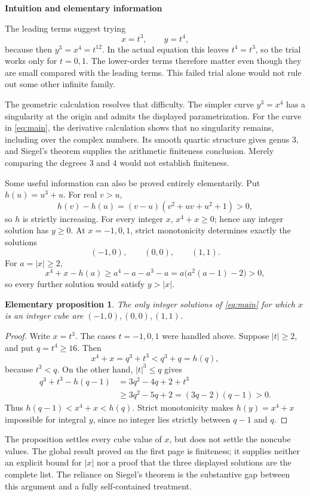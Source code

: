 \documentclass[11pt,a4paper]{article}
\newtheorem*{proposition}{Elementary proposition}
\begin{document}
\newpage
\begin{center}
{\large\bfseries\color{ink} Intuition and elementary information}
\end{center}

The leading terms suggest trying
\[
 x=t^3,\qquad y=t^4,
\]
because then \(y^3=x^4=t^{12}\). In the actual equation this leaves
\(t^4=t^3\), so the trial works only for \(t=0,1\). The lower-order terms
therefore matter even though they are small compared with the leading terms.
This failed trial alone would not rule out some other infinite family.

The geometric calculation resolves that difficulty. The simpler curve
\(y^3=x^4\) has a singularity at the origin and admits the displayed
parametrization. For the curve in \eqref{eq:main}, the derivative calculation
shows that no singularity remains, including over the complex numbers. Its
smooth quartic structure gives genus \(3\), and Siegel's theorem supplies the
arithmetic finiteness conclusion. Merely comparing the degrees \(3\) and \(4\)
would not establish finiteness.

Some useful information can also be proved entirely elementarily. Put
\(h(u)=u^3+u\). For real \(v>u\),
\[
 h(v)-h(u)=(v-u)(v^2+uv+u^2+1)>0,
\]
so \(h\) is strictly increasing. For every integer \(x\),
\(x^4+x\geq0\); hence any integer solution has \(y\geq0\). At
\(x=-1,0,1\), strict monotonicity determines exactly the solutions
\[
 \boxed{(-1,0),\qquad(0,0),\qquad(1,1).}
\]
For \(a=|x|\geq2\),
\[
 x^4+x-h(a)\geq a^4-a-a^3-a
 =a\bigl(a^2(a-1)-2\bigr)>0,
\]
so every further solution would satisfy \(y>|x|\).

\begin{proposition}
The only integer solutions of \eqref{eq:main} for which \(x\) is an integer
cube are \((-1,0),(0,0),(1,1)\).
\end{proposition}
\begin{proof}
Write \(x=t^3\). The cases \(t=-1,0,1\) were handled above. Suppose
\(|t|\geq2\), and put \(q=t^4\geq16\). Then
\[
 x^4+x=q^3+t^3<q^3+q=h(q),
\]
because \(t^3<q\). On the other hand, \(|t|^3\leq q\) gives
\begin{align*}
 q^3+t^3-h(q-1)
 &=3q^2-4q+2+t^3\\
 &\geq3q^2-5q+2=(3q-2)(q-1)>0.
\end{align*}
Thus \(h(q-1)<x^4+x<h(q)\). Strict monotonicity makes
\(h(y)=x^4+x\) impossible for integral \(y\), since no integer lies
strictly between \(q-1\) and \(q\).
\end{proof}

The proposition settles every cube value of \(x\), but does not settle the
noncube values. The global result proved on the first page is finiteness;
it supplies neither an explicit bound for \(|x|\) nor a proof that the three
displayed solutions are the complete list. The reliance on Siegel's theorem
is the substantive gap between this argument and a fully self-contained
treatment.
\end{document}
